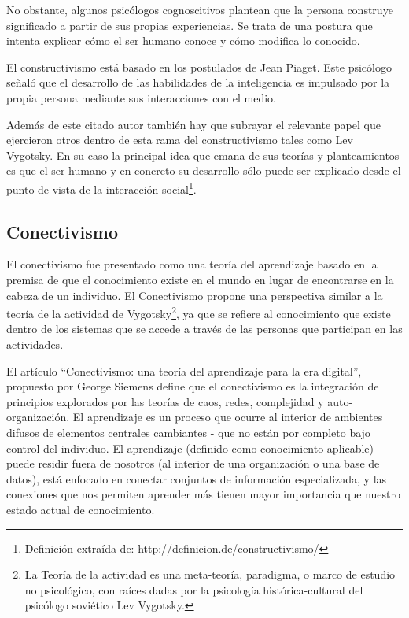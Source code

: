 No obstante, algunos psicólogos cognoscitivos plantean que la persona construye
significado a partir de sus propias experiencias. Se trata de una postura que
intenta explicar cómo el ser humano conoce y cómo modifica lo
conocido\cite{Rojas}.

El constructivismo está basado en los postulados de Jean Piaget. Este psicólogo
señaló que el desarrollo de las habilidades de la inteligencia es impulsado por
la propia persona mediante sus interacciones con el medio.

Además de este citado autor también hay que subrayar el relevante papel que
ejercieron otros dentro de esta rama del constructivismo tales como Lev
Vygotsky. En su caso la principal idea que emana de sus teorías y 
planteamientos es que el ser humano y en concreto su desarrollo sólo puede ser
explicado desde el punto de vista de la interacción social\footnote{Definición
extraída de: http://definicion.de/constructivismo/}.


\subsection{Conectivismo}

El conectivismo fue presentado como una teoría del aprendizaje basado en la
premisa de que el conocimiento existe en el mundo en lugar de encontrarse en la
cabeza de un individuo. El Conectivismo propone una perspectiva similar a la
teoría de la actividad de Vygotsky\footnote{La Teoría de la actividad es una
meta-teoría, paradigma, o marco de estudio no psicológico, con raíces dadas por
la psicología histórica-cultural del psicólogo soviético Lev Vygotsky.}, ya que
se refiere al conocimiento que existe dentro de los sistemas que se accede a
través de las personas que participan en las actividades.

El artículo “Conectivismo: una teoría del aprendizaje para la era digital”,
propuesto por George Siemens define que el conectivismo es la integración de
principios explorados por las teorías de caos, redes, complejidad y
auto-organización. El aprendizaje es un proceso que ocurre al interior de
ambientes difusos de elementos centrales cambiantes - que no están por completo
bajo control del individuo. El aprendizaje (definido como conocimiento
aplicable) puede residir fuera de nosotros (al interior de una organización o
una base de datos), está enfocado en conectar conjuntos de información
especializada, y las conexiones que nos permiten aprender más tienen mayor
importancia que nuestro estado actual de conocimiento.

